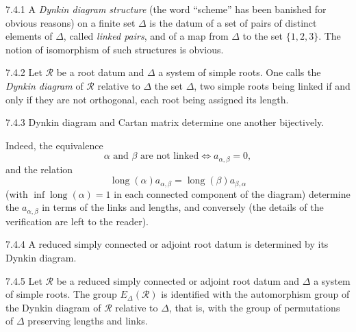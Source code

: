 \begin{definition}{7.4.1}\label{XXI.7.4.1}
A \emph{Dynkin diagram structure} (the word ``scheme'' has been banished for obvious reasons) on a finite set $\Delta$ is the datum of a set of pairs of distinct elements of $\Delta$, called \emph{linked pairs}, and of a map from $\Delta$ to the set $\{1,2,3\}$. The notion of isomorphism of such structures is obvious.
\end{definition}
\begin{definition}{7.4.2}\label{XXI.7.4.2}
Let $\mathcal R$ be a root datum and $\Delta$ a system of simple roots. One calls the \emph{Dynkin diagram} of $\mathcal R$ relative to $\Delta$ the set $\Delta$, two simple roots being linked if and only if they are not orthogonal, each root being assigned its length.
\end{definition}
\begin{proposition}{7.4.3}\label{XXI.7.4.3}
Dynkin diagram and Cartan matrix determine one another bijectively.
\end{proposition}
Indeed, the equivalence
\[
\alpha\text{ and }\beta\text{ are not linked}\Longleftrightarrow a_{\alpha,\beta}=0,
\]
and the relation
\[
\operatorname{long}(\alpha)a_{\alpha,\beta}=\operatorname{long}(\beta)a_{\beta,\alpha}
\]
(with $\inf\operatorname{long}(\alpha)=1$ in each connected component of the diagram) determine the $a_{\alpha,\beta}$ in terms of the links and lengths, and conversely (the details of the verification are left to the reader).
\begin{corollary}{7.4.4}\label{XXI.7.4.4}
A reduced simply connected or adjoint root datum is determined by its Dynkin diagram.
\end{corollary}
\begin{corollary}{7.4.5}\label{XXI.7.4.5}
Let $\mathcal R$ be a reduced simply connected or adjoint root datum and $\Delta$ a system of simple roots. The group $E_\Delta(\mathcal R)$ is identified with the automorphism group of the Dynkin diagram of $\mathcal R$ relative to $\Delta$, that is, with the group of permutations of $\Delta$ preserving lengths and links.
\end{corollary}
